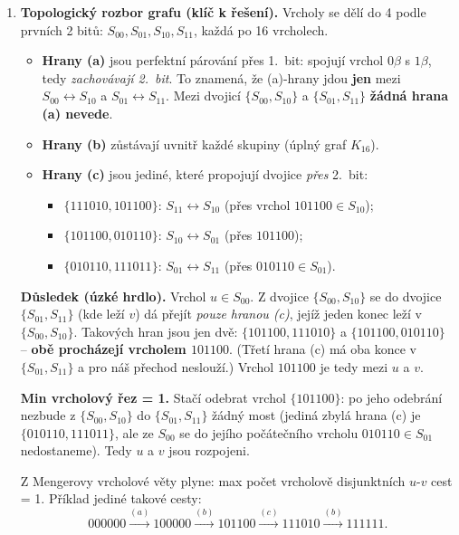 \documentclass[11pt,a4paper]{article}
\begin{document}
\begin{priklad}
\begin{enumerate}[label=(\arabic*)]
  \item \textbf{Topologický rozbor grafu (klíč k řešení).} Vrcholy se dělí do 4  podle prvních 2 bitů: $S_{00}, S_{01}, S_{10}, S_{11}$, každá po 16 vrcholech.
  \begin{itemize}
    \item \textbf{Hrany (a)} jsou perfektní párování přes 1.\ bit: spojují vrchol $0\beta$ s $1\beta$, tedy \emph{zachovávají 2.\ bit}. To znamená, že (a)-hrany jdou \textbf{jen} mezi $S_{00}\!\leftrightarrow\! S_{10}$ a $S_{01}\!\leftrightarrow\! S_{11}$. Mezi dvojicí $\{S_{00},S_{10}\}$ a $\{S_{01},S_{11}\}$ \textbf{žádná hrana (a) nevede}.
    \item \textbf{Hrany (b)} zůstávají uvnitř každé skupiny (úplný graf $K_{16}$).
    \item \textbf{Hrany (c)} jsou jediné, které propojují dvojice \emph{přes} 2.\ bit:
      \begin{itemize}
        \item $\{111010,101100\}$: $S_{11}\!\leftrightarrow\! S_{10}$ (přes vrchol $101100\in S_{10}$);
        \item $\{101100,010110\}$: $S_{10}\!\leftrightarrow\! S_{01}$ (přes $101100$);
        \item $\{010110,111011\}$: $S_{01}\!\leftrightarrow\! S_{11}$ (přes $010110\in S_{01}$).
      \end{itemize}
  \end{itemize}

  \medskip\noindent\textbf{Důsledek (úzké hrdlo).} Vrchol $u\in S_{00}$. Z dvojice $\{S_{00},S_{10}\}$ se do dvojice $\{S_{01},S_{11}\}$ (kde leží $v$) dá přejít \emph{pouze hranou (c)}, jejíž jeden konec leží v $\{S_{00},S_{10}\}$. Takových hran jsou jen dvě: $\{101100,111010\}$ a $\{101100,010110\}$ -- \textbf{obě procházejí vrcholem $101100$}. (Třetí hrana (c) má oba konce v $\{S_{01},S_{11}\}$ a pro náš přechod neslouží.) Vrchol $101100$ je tedy  mezi $u$ a $v$.

  \medskip\noindent\textbf{Min vrcholový řez = 1.} Stačí odebrat vrchol $\boxed{\{101100\}}$: po jeho odebrání nezbude z $\{S_{00},S_{10}\}$ do $\{S_{01},S_{11}\}$ žádný most (jediná zbylá hrana (c) je $\{010110,111011\}$, ale ze $S_{00}$ se do jejího počátečního vrcholu $010110\in S_{01}$ nedostaneme). Tedy $u$ a $v$ jsou rozpojeni.

  Z Mengerovy vrcholové věty plyne: max počet vrcholově disjunktních $u$-$v$ cest = 1. Příklad jediné takové cesty:
  \[ 000000 \xrightarrow{(a)} 100000 \xrightarrow{(b)} 101100 \xrightarrow{(c)} 111010 \xrightarrow{(b)} 111111. \]


\end{enumerate}
\end{priklad}
\end{document}

